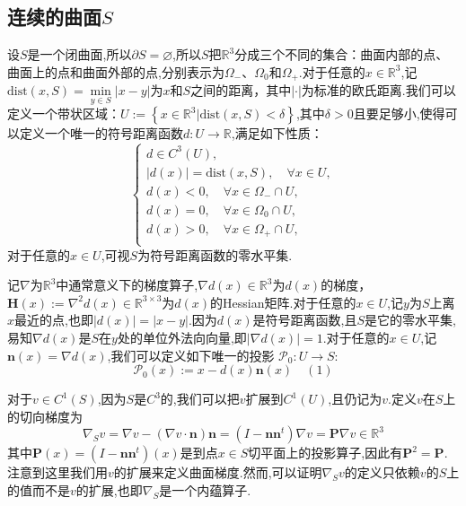 \documentclass{article}
\begin{document}
\subsection{连续的曲面$S$}
设$S$是一个闭曲面,所以$\partial S=\varnothing$,所以$S$把$\mathbb{R}^3$分成三个不同的集合：曲面内部的点、曲面上的点和曲面外部的点,分别表示为$\Omega_{-}$、$\Omega_0$和$\Omega_{+}$.对于任意的$x\in\mathbb{R}^3$,记$\mathrm{dist}(x,S)=\min\limits_{y\in S}\left|x-y\right|$为$x$和$S$之间的距离，其中$|\cdot|$为标准的欧氏距离.我们可以定义一个带状区域：$U:=\left\{x\in\mathbb{R}^3|\mathrm{dist}(x,S)<\delta\right\}$,其中$\delta>0$且要足够小,使得可以定义一个唯一的符号距离函数$d:U\rightarrow\mathbb{R}$,满足如下性质：
\begin{equation}\label{eq:MA}
\left\{
\begin{array}{l}
d\in C^3(U),\\
|d(x)|=\mathrm{dist}(x,S),\quad \forall x\in U,\\
d(x)< 0,\quad\forall x\in\Omega_{-}\cap U,\\
d(x)= 0,\quad\forall x\in \Omega_0\cap U,\\
d(x)> 0,\quad\forall x\in\Omega_{+}\cap U,\\
\end{array}\right.
\end{equation}
对于任意的$x\in U$,可视$S$为符号距离函数的零水平集.

记$\nabla$为$\mathbb{R}^3$中通常意义下的梯度算子,$\nabla d(x)\in\mathbb{R}^3$为$d(x)$的梯度，$\boldsymbol{H}(x):=\nabla^2d(x)\in\mathbb{R}^{3\times 3}$为$d(x)$的Hessian矩阵.对于任意的$x\in U$,记$y$为$S$上离$x$最近的点,也即$|d(x)|=\left|x-y\right|$.因为$d(x)$是符号距离函数,且$S$是它的零水平集,易知$\nabla d(x)$是$S$在$y$处的单位外法向向量,即$\left|\nabla d(x)\right|=1$.对于任意的$x\in U$,记$\boldsymbol{n}(x)=\nabla d(x)$,我们可以定义如下唯一的投影
$\mathcal{P}_0:U\rightarrow S$:
\begin{equation*}
\mathcal{P}_0(x):=x-d(x)\boldsymbol{n}(x)\quad(1)
\end{equation*}

对于$v\in C^1(S)$,因为$S$是$C^3$的,我们可以把$v$扩展到$C^1(U)$,且仍记为$v$.定义$v$在$S$上的切向梯度为
\begin{equation*}
\nabla_Sv=\nabla v-(\nabla v\cdot\boldsymbol{n})\boldsymbol{n}=(I-\boldsymbol{n}\boldsymbol{n}^t)\nabla v=\boldsymbol{P}\nabla v\in\mathbb{R}^3
\end{equation*}
其中$\boldsymbol{P}(x)=(I-\boldsymbol{n}\boldsymbol{n}^t)(x)$是到点$x\in S$切平面上的投影算子,因此有$\boldsymbol{P}^2=\boldsymbol{P}$.注意到这里我们用$v$的扩展来定义曲面梯度.然而,可以证明$\nabla_Sv$的定义只依赖$v$的$S$上的值而不是$v$的扩展,也即$\nabla_S$是一个内蕴算子.
\end{document}
